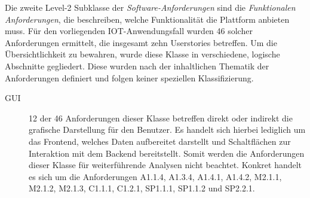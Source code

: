 Die zweite Level-2 Subklasse der \textit{Software-Anforderungen} sind die \textit{Funktionalen Anforderungen}, die beschreiben, welche Funktionalität die Plattform anbieten muss. Für den vorliegenden IOT-Anwendungsfall wurden 46 solcher Anforderungen ermittelt, die insgesamt zehn Userstories betreffen. Um die Übersichtlichkeit zu bewahren, wurde diese Klasse in verschiedene, logische Abschnitte gegliedert. Diese wurden nach der inhaltlichen Thematik der Anforderungen definiert und folgen keiner speziellen Klassifizierung.

\begin{description}
  \item[GUI] 12 der 46 Anforderungen dieser Klasse betreffen direkt oder indirekt die grafische Darstellung für den Benutzer. Es handelt sich hierbei lediglich um das Frontend, welches Daten aufbereitet darstellt und Schaltflächen zur Interaktion mit dem Backend bereitstellt. Somit werden die Anforderungen dieser Klasse für weiterführende Analysen nicht beachtet. Konkret handelt es sich um die Anforderungen A1.1.4, A1.3.4, A1.4.1, A1.4.2, M2.1.1, M2.1.2, M2.1.3, C1.1.1, C1.2.1, SP1.1.1, SP1.1.2 und SP2.2.1.


\end{description}

